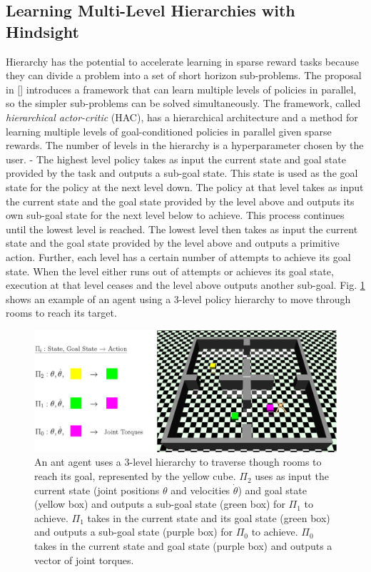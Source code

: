 \documentclass[conference]{IEEEtran}
\begin{document}
\subsection{Learning Multi-Level Hierarchies with Hindsight}
Hierarchy has the potential to accelerate learning in sparse reward tasks because they can divide a problem into a set of short horizon sub-problems. The proposal in [\cite{levy2019learning}] introduces a framework that can learn multiple levels of policies in parallel, so the simpler sub-problems can be solved simultaneously. The framework, called \textit{hierarchical actor-critic} (HAC), has a hierarchical architecture and a method for learning multiple levels of goal-conditioned policies in parallel given sparse rewards. The number of levels in the hierarchy is a hyperparameter chosen by the user.
-
The highest level policy takes as input the current state and goal state provided by the task and outputs a sub-goal state. This state is used as the goal state for the policy at the next level down. The policy at that level takes as input the current state and the goal state provided by the level above and outputs its own sub-goal state for the next level below to achieve. This process continues until the lowest level is reached. The lowest level then takes as input the current state and the goal state provided by the level above and outputs a primitive action. Further, each level has a certain number of attempts to achieve its goal state. When the level either runs out of attempts or achieves its goal state, execution at that level ceases and the level above outputs another sub-goal. Fig. \ref{fig:mutilevel_her_example} shows an example of an agent using a 3-level policy hierarchy to move through rooms to reach its target.
\begin{figure}[ht]
\centering
\includegraphics[width=0.9\columnwidth]{img/MultiLevelHER_example.png}
\caption{An ant agent uses a 3-level hierarchy to traverse though rooms to reach its goal, represented by the yellow cube. $\Pi_2$ uses as input the current state (joint positions $\theta$ and velocities $\dot{\theta}$) and goal state (yellow box) and outputs a sub-goal state (green box) for $\Pi_1$ to achieve. $\Pi_1$ takes in the current state and its goal state (green box) and outputs a sub-goal state (purple box) for $\Pi_0$ to achieve. $\Pi_0$ takes in the current state and goal state (purple box) and outputs a vector of joint torques.}
\label{fig:mutilevel_her_example}
\end{figure}
\end{document}
